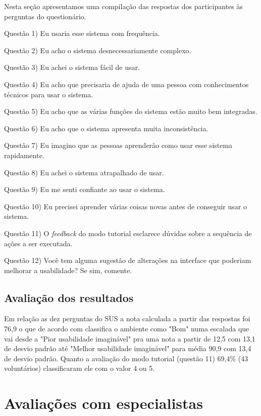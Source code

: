 Nesta seção apresentamos uma compilação das respostas dos participantes às perguntas do questionário.

Questão 1) Eu usaria esse sistema com frequência.

Questão 2) Eu acho o sistema desnecessariamente complexo.

Questão 3) Eu achei o sistema fácil de usar.

Questão 4) Eu acho que precisaria de ajuda de uma pessoa com conhecimentos técnicos para usar o sistema.

Questão 5) Eu acho que as várias funções do sistema estão muito bem integradas.

Questão 6) Eu acho que o sistema apresenta muita inconsistência.

Questão 7) Eu imagino que as pessoas aprenderão como usar esse sistema rapidamente.

Questão 8) Eu achei o sistema atrapalhado de usar.

Questão 9) Eu me senti confiante ao usar o sistema.

Questão 10) Eu precisei aprender várias coisas novas antes de conseguir usar o sistema.

Questão 11) O \textit{feedback} do modo tutorial esclarece dúvidas sobre a sequência de ações a ser executada.

Questão 12) Você tem alguma sugestão de alterações na interface que poderiam melhorar a usabilidade? Se sim, comente.

\subsection{Avaliação dos resultados}
\label{sec:avaliacaoUsabilidde}

Em relação as dez perguntas do \acrshort{SUS} a nota calculada a partir das respostas foi 76,9 o que de acordo com \textcite{BangorAaron2009} classifica o ambiente como "Bom" numa escalada que vai desde a "Pior usabilidade imaginável" pra uma nota a partir de 12,5 com 13,1 de desvio padrão até "Melhor usabilidade imaginável" para média 90,9 com 13,4 de desvio padrão. 
Quanto a avaliação do modo tutorial (questão 11) 69,4\% (43 voluntários) classificaram ele com o valor 4 ou 5.

\section{Avaliações com especialistas}
\label{sec:testeEspecialistas}

